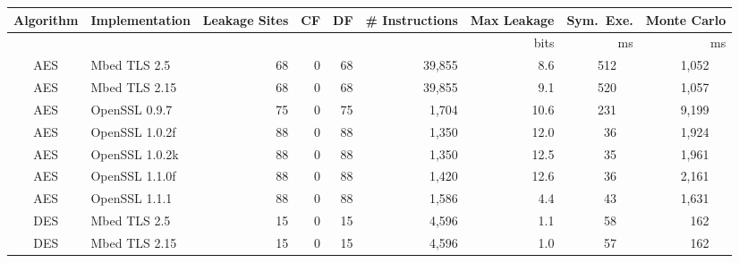 \begin{table}[h]
{    \begin{tabular}{clrrrrrrr}
        \hline
        \textbf{Algorithm} & \textbf{Implementation}  & \textbf{Leakage Sites} & \textbf{CF}         & \textbf{DF}
                           & \textbf{\# Instructions} & \textbf{Max Leakage}   & \textbf{Sym.\ Exe.} & \textbf{Monte Carlo}                                                    \\\hline
                           &                          &                        &                     &                      &             & bits & ms        & ms              \\\cline{7-9}
        AES                & Mbed TLS 2.5             & 68                     & 0                   & 68                   & 39,855      & 8.6  & 512 ~~    & 1,052 ~~        \\
        AES                & Mbed TLS 2.15            & 68                     & 0                   & 68                   & 39,855      & 9.1  & 520 ~~    & 1,057 ~~        \\
        AES                & OpenSSL 0.9.7            & 75                     & 0                   & 75                   & 1,704       & 10.6 & 231 ~~    & 9,199 ~~        \\
        AES                & OpenSSL 1.0.2f           & 88                     & 0                   & 88                   & 1,350       & 12.0 & 36 ~~     & 1,924 ~~        \\
        AES                & OpenSSL 1.0.2k           & 88                     & 0                   & 88                   & 1,350       & 12.5 & 35 ~~     & 1,961 ~~        \\
        AES                & OpenSSL 1.1.0f           & 88                     & 0                   & 88                   & 1,420       & 12.6 & 36 ~~     & 2,161 ~~        \\
        AES                & OpenSSL 1.1.1            & 88                     & 0                   & 88                   & 1,586       & 4.4  & 43 ~~     & 1,631 ~~        \\
        DES                & Mbed TLS 2.5             & 15                     & 0                   & 15                   & 4,596       & 1.1  & 58 ~~     & 162 ~~          \\
        DES                & Mbed TLS 2.15            & 15                     & 0                   & 15                   & 4,596       & 1.0  & 57 ~~     & 162 ~~          \\

\end{tabular}}
\end{table}
